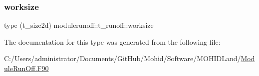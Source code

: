 \mbox{\label{structmodulerunoff_1_1t__runoff_a661491d498286923ef73a051b5bab036}} 
\subsubsection{\texorpdfstring{worksize}{worksize}}
{\footnotesize\ttfamily type (t\+\_\+size2d) modulerunoff\+::t\+\_\+runoff\+::worksize\hspace{0.3cm}{\ttfamily [private]}}



The documentation for this type was generated from the following file\+:\begin{DoxyCompactItemize}
\item 
C\+:/\+Users/administrator/\+Documents/\+Git\+Hub/\+Mohid/\+Software/\+M\+O\+H\+I\+D\+Land/\mbox{\hyperlink{_module_run_off_8_f90}{Module\+Run\+Off.\+F90}}\end{DoxyCompactItemize}
